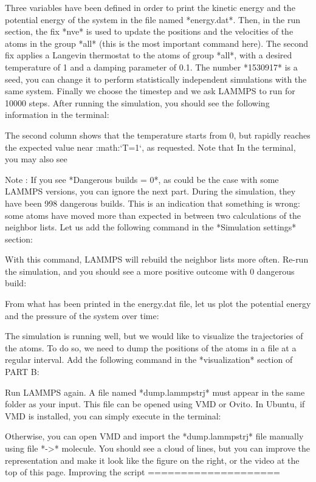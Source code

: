 Three variables have been defined in order
to print the kinetic energy and the potential energy 
of the system in the file named *energy.dat*. Then,
in the run section, the fix *nve* is used to update the
positions and the velocities of the atoms in the group
*all* (this is the most important command here). The second
fix applies a Langevin thermostat to the atoms of group
*all*, with a desired temperature of 1 and a damping
parameter of 0.1. The number *1530917* is a seed, you can
change it to perform statistically independent simulations
with the same system. Finally we choose the timestep
and we ask LAMMPS to run for 10000 steps. After running
the simulation, you should see the following information in
the terminal:

The second column shows that the temperature
starts from 0, but rapidly reaches the
expected value near :math:`T=1`, as requested. 
Note that  In the terminal, you may also see

Note : If you see *Dangerous builds = 0*, as could be
the case with some LAMMPS versions, you can ignore
the next part.
During the simulation, they have been 998 dangerous builds.
This is an indication that something is wrong: some atoms
have moved more than expected in between two calculations of
the neighbor lists. Let us add the following command in the
*Simulation settings* section:

With this command, LAMMPS will rebuild the neighbor lists
more often. Re-run the simulation, and you should see a more
positive outcome with 0 dangerous build:

From what has been printed in the energy.dat file, let us
plot the potential energy and the pressure of
the system over time:


The simulation is running well, but we would like to
visualize the trajectories of the atoms. To do so, we need
to dump the positions of the atoms in a file at a regular
interval. Add the following command in the *visualization*
section of PART B:

Run LAMMPS again. A file named *dump.lammpstrj* must appear in
the same folder as your input. This file can be opened using
VMD or Ovito. In Ubuntu, if VMD is installed, you can simply
execute in the terminal:

Otherwise, you can open VMD and import the *dump.lammpstrj*
file manually using file *->* molecule. You should see a cloud
of lines, but you can improve the representation and make it
look like the figure on the right, or the video at the 
top of this page. 
Improving the script
====================

